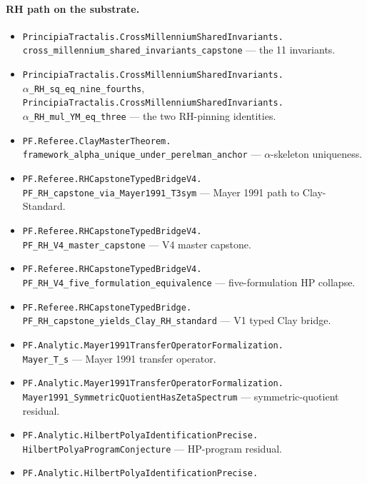 \documentclass[11pt,a4paper]{article}
\theoremstyle{plain}
\theoremstyle{definition}
\begin{document}
\paragraph{RH path on the substrate.}
\begin{itemize}[leftmargin=*,nosep]
\item \texttt{PrincipiaTractalis.CrossMillenniumSharedInvariants.\\
  cross\_millennium\_shared\_invariants\_capstone}
  --- the 11 invariants.
\item \texttt{PrincipiaTractalis.CrossMillenniumSharedInvariants.\\
  $\alpha$\_RH\_sq\_eq\_nine\_fourths},
  \texttt{PrincipiaTractalis.CrossMillenniumSharedInvariants.\\
  $\alpha$\_RH\_mul\_YM\_eq\_three} --- the two RH-pinning identities.
\item \texttt{PF.Referee.ClayMasterTheorem.\\
  framework\_alpha\_unique\_under\_perelman\_anchor}
  --- $\alpha$-skeleton uniqueness.
\item \texttt{PF.Referee.RHCapstoneTypedBridgeV4.\\
  PF\_RH\_capstone\_via\_Mayer1991\_T3sym}
  --- Mayer 1991 path to Clay-Standard.
\item \texttt{PF.Referee.RHCapstoneTypedBridgeV4.\\
  PF\_RH\_V4\_master\_capstone}
  --- V4 master capstone.
\item \texttt{PF.Referee.RHCapstoneTypedBridgeV4.\\
  PF\_RH\_V4\_five\_formulation\_equivalence}
  --- five-formulation HP collapse.
\item \texttt{PF.Referee.RHCapstoneTypedBridge.\\
  PF\_RH\_capstone\_yields\_Clay\_RH\_standard}
  --- V1 typed Clay bridge.
\item \texttt{PF.Analytic.Mayer1991TransferOperatorFormalization.\\
  Mayer\_T\_s} --- Mayer 1991 transfer operator.
\item \texttt{PF.Analytic.Mayer1991TransferOperatorFormalization.\\
  Mayer1991\_SymmetricQuotientHasZetaSpectrum}
  --- symmetric-quotient residual.
\item \texttt{PF.Analytic.HilbertPolyaIdentificationPrecise.\\
  HilbertPolyaProgramConjecture} --- HP-program residual.
\item \texttt{PF.Analytic.HilbertPolyaIdentificationPrecise.\\
}
\end{itemize}
\end{document}
